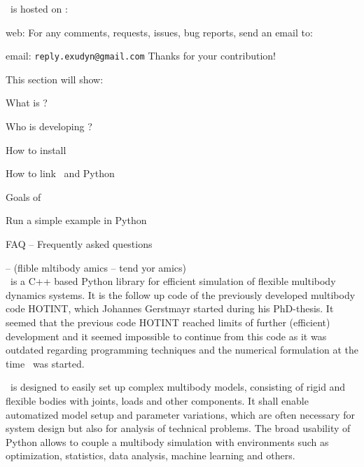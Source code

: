 %
\noindent \codeName\ is hosted on  \cite{EXUDYNgit}:
\bi
  \item web: 
\ei
%
For any comments, requests, issues, bug reports, send an email to: 
\bi
  \item email: \texttt{reply.exudyn@gmail.com}
\ei
Thanks for your contribution!

This section will show:
\bn
  \item What is \codeName ?
  \item Who is developing \codeName ?
  \item How to install \codeName\ 
  \item How to link \codeName\ and Python
  \item Goals of \codeName
  \item Run a simple example in Python
  \item FAQ -- Frequently asked questions
\en

\codeName -- {\small (flible mltibody amics  -- tend yor amics)}\vspace{6pt}\\
\noindent \codeName\ is a C++ based Python library for efficient simulation of flexible multibody dynamics systems.
It is the follow up code of the previously developed multibody code HOTINT, which Johannes Gerstmayr started during his PhD-thesis.
It seemed that the previous code HOTINT reached limits of further (efficient) development and it seemed impossible to continue from this code as it was outdated regarding programming techniques and the numerical formulation at the time \codeName\ was started.

\codeName\ is designed to easily set up complex multibody models, consisting of rigid and flexible bodies with joints, loads and other components. It shall enable automatized model setup and parameter variations, which are often necessary for system design but also for analysis of technical problems. The broad usability of Python allows to couple a multibody simulation with environments such as optimization, statistics, data analysis, machine learning and others.

